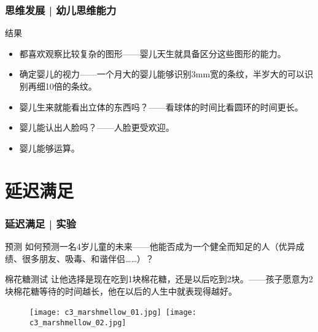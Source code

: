 \begin{frame}
  \frametitle{思维发展 | 幼儿思维能力}
  \begin{block}{结果}
    \begin{itemize}
      \item 都喜欢观察比较复杂的图形——婴儿天生就具备区分这些图形的能力。
      \item 确定婴儿的视力——一个月大的婴儿能够识别3mm宽的条纹，半岁大的可以识别再细10倍的条纹。
      \item 婴儿生来就能看出立体的东西吗？——看球体的时间比看圆环的时间更长。
      \item 婴儿能认出人脸吗？——人脸更受欢迎。
      \item 婴儿能够运算。
    \end{itemize}
  \end{block}
\end{frame}

\section{延迟满足}
\begin{frame}
  \frametitle{延迟满足 | 实验}
  \begin{block}{预测}
    如何预测一名4岁儿童的未来——他能否成为一个健全而知足的人（优异成绩、很多朋友、吸毒、和谐伴侣……）？
  \end{block}
  \pause
  \begin{block}{棉花糖测试}
    让他选择是现在吃到1块棉花糖，还是以后吃到2块。——孩子愿意为2块棉花糖等待的时间越长，他在以后的人生中就表现得越好。
    \vspace{-0.8em}
    \begin{figure}
      \centering
      \texttt{[image: c3\_marshmellow\_01.jpg]}\ 
      \texttt{[image: c3\_marshmellow\_02.jpg]}
    \end{figure}
  \end{block}
\end{frame}


